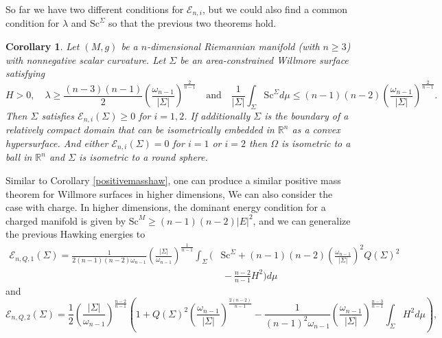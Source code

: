 \documentclass[12pt,a4paper]{amsart}
\theoremstyle{plain}
\newtheorem{corollary}[theorem]{Corollary}
\theoremstyle{definition}
\begin{document}
So far we have two different conditions for $\mathcal{E}_{n,i}$, but we could also find a common condition for $\lambda$ and $\mathrm{Sc}^{\Sigma} $ so that the previous two theorems hold.
\begin{corollary}
Let $(M,g)$ be a $n$-dimensional Riemannian  manifold (with $n\geq 3$) with nonnegative scalar curvature. Let $\Sigma$ be an area-constrained Willmore surface satisfying 
    \begin{equation}
        H>0, \quad \lambda\geq  \frac{(n-3)(n-1)}{2} \left( \frac{\omega_{n-1}}{ |\Sigma|} \right)^{\frac{2}{n-1}}  \quad \text{and} \quad   \frac{1}{|\Sigma| } \int_{\Sigma} 
\mathrm{Sc}^{\Sigma} d\mu\leq (n-1)(n-2) \left( \frac{\omega_{n-1}}{ |\Sigma|} \right)^{\frac{2}{n-1}}. 
    \end{equation}
Then $\Sigma$    satisfies $ \mathcal{E}_{n,i}(\Sigma) \geq 0$ for $i=1,2$.  If additionally  $\Sigma $ is the boundary of a relatively compact domain that can be isometrically embedded in \(\mathbb{R}^n\) as a convex hypersurface. And  either $\mathcal{E}_{n,i}(\Sigma) = 0 $ for $i=1$ or $i=2$ then   $\Omega$ is isometric to a ball in $\mathbb{R}^{n}$ and $\Sigma$ is isometric to a round sphere.
\end{corollary}
Similar to Corollary \ref{positivemasshaw}, one can produce a similar positive mass theorem for Willmore surfaces in higher dimensions, We can also consider the case with charge. In higher dimensions, the dominant energy condition for a charged manifold is given by $\mathrm{Sc}^M \geq (n-1)(n-2)|E|^2 $, and we can generalize the previous Hawking energies to   
\begin{equation}
\begin{split}
 \mathcal{E}_{n,Q,1}(\Sigma)=   \frac{1}{2(n-1)(n-2) \omega_{n-1}} 
\left( \frac{|\Sigma|}{\omega_{n-1}} \right)^{\frac{1}{n-1}}
\int_{\Sigma} 
\Big(& \mathrm{Sc}^{\Sigma} + (n-1)(n-2) \left( \frac{\omega_{n-1}}{ |\Sigma|} \right)^2 Q(\Sigma)^2\\
& \,- \frac{n-2}{n-1} H^2 \Big)
d\mu
\end{split}
\end{equation}
and 
\begin{equation}
\mathcal{E}_{n,Q,2}(\Sigma) =    \frac{1}{2} \left( \frac{|\Sigma|}{\omega_{n-1}} \right)^{\frac{n-2}{n-1}} \left(1 + Q(\Sigma)^2 \left( \frac{\omega_{n-1}}{ |\Sigma|} \right)^{\frac{2(n-2)}{n-1}} - \frac{1}{(n-1)^2 \omega_{n-1}} \left( \frac{\omega_{n-1}}{ |\Sigma|} \right)^{\frac{n-3}{n-1}} \int_{\Sigma }H^2  d\mu \right),
\end{equation}
\end{document}
